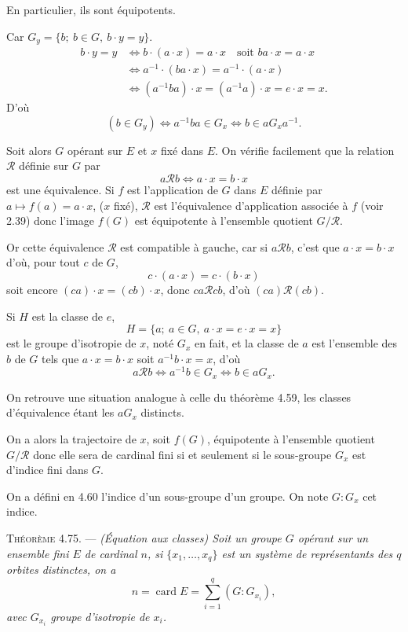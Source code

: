 En particulier, ils sont équipotents.

Car $G_y=\{b;\ b\in G,\ b\cdot y=y\}$.
\begin{align*}
b\cdot y=y
&\Longleftrightarrow b\cdot(a\cdot x)=a\cdot x\quad\text{soit }ba\cdot x=a\cdot x\\
&\Longleftrightarrow a^{-1}\cdot(ba\cdot x)=a^{-1}\cdot(a\cdot x)\\
&\Longleftrightarrow (a^{-1}ba)\cdot x=(a^{-1}a)\cdot x=e\cdot x=x.
\end{align*}
D'où
\[
(b\in G_y)\Longleftrightarrow a^{-1}ba\in G_x\Longleftrightarrow b\in aG_xa^{-1}.
\]
\bookend

Soit alors $G$ opérant sur $E$ et $x$ fixé dans $E$. On vérifie facilement que la relation $\mathcal R$ définie sur $G$ par
\[
a\mathcal R b\Longleftrightarrow a\cdot x=b\cdot x
\]
est une équivalence. Si $f$ est l'application de $G$ dans $E$ définie par $a\mapsto f(a)=a\cdot x$, ($x$ fixé), $\mathcal R$ est l'équivalence d'application associée à $f$ (voir 2.39) donc l'image $f(G)$ est équipotente à l'ensemble quotient $G/\mathcal R$.

Or cette équivalence $\mathcal R$ est compatible à gauche, car si $a\mathcal R b$, c'est que $a\cdot x=b\cdot x$ d'où, pour tout $c$ de $G$,
\[
c\cdot(a\cdot x)=c\cdot(b\cdot x)
\]
soit encore $(ca)\cdot x=(cb)\cdot x$, donc $ca\mathcal R cb$, d'où $(ca)\mathcal R(cb)$.

Si $H$ est la classe de $e$,
\[
H=\{a;\ a\in G,\ a\cdot x=e\cdot x=x\}
\]
est le groupe d'isotropie de $x$, noté $G_x$ en fait, et la classe de $a$ est l'ensemble des $b$ de $G$ tels que $a\cdot x=b\cdot x$ soit $a^{-1}b\cdot x=x$, d'où
\[
a\mathcal R b\Longleftrightarrow a^{-1}b\in G_x\Longleftrightarrow b\in aG_x.
\]

On retrouve une situation analogue à celle du théorème 4.59, les classes d'équivalence étant les $aG_x$ distincts.

On a alors la trajectoire de $x$, soit $f(G)$, équipotente à l'ensemble quotient $G/\mathcal R$ donc elle sera de cardinal fini si et seulement si le sous-groupe $G_x$ est d'indice fini dans $G$.

On a défini en 4.60 l'indice d'un sous-groupe d'un groupe. On note $G:G_x$ cet indice.

\medskip\noindent\textsc{Théorème 4.75.} --- \emph{(Équation aux classes) Soit un groupe $G$ opérant sur un ensemble fini $E$ de cardinal $n$, si $\{x_1,\ldots,x_q\}$ est un système de représentants des $q$ orbites distinctes, on a
\[
n=\operatorname{card}E=\sum_{i=1}^{q}(G:G_{x_i}),
\]
avec $G_{x_i}$ groupe d'isotropie de $x_i$.}

